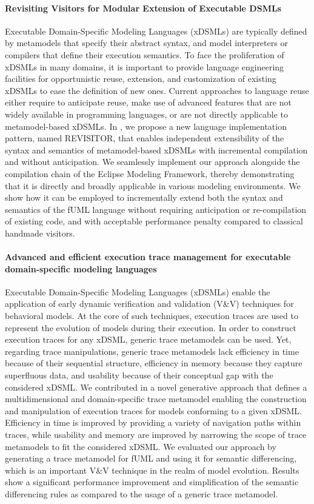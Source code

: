 \paragraph{Revisiting Visitors for Modular Extension of Executable DSMLs}
Executable Domain-Specific Modeling Languages (xDSMLs) are typically defined by metamodels that specify their abstract syntax, and model interpreters or compilers that define their execution semantics. To face the proliferation of xDSMLs in many domains, it is important to provide language engineering facilities for opportunistic reuse, extension, and customization of existing xDSMLs to ease the definition of new ones. Current approaches to language reuse either require to anticipate reuse, make use of advanced features that are not widely available in programming languages, or are not directly applicable to metamodel-based xDSMLs. In \cite{leduc:hal-01568169}, we propose a new language implementation pattern, named REVISITOR, that enables independent extensibility of the syntax and semantics of metamodel-based xDSMLs with incremental compilation and without anticipation. We seamlessly implement our approach alongside the compilation chain of the Eclipse Modeling Framework, thereby demonstrating that it is directly and broadly applicable in various modeling environments. We show how it can be employed to incrementally extend both the syntax and semantics of the fUML language without requiring anticipation or re-compilation of existing code, and with acceptable performance penalty compared to classical handmade visitors.

\paragraph{Advanced and efficient execution trace management for executable domain-specific modeling languages}
Executable Domain-Specific Modeling Languages (xDSMLs) enable the application of early dynamic verification and validation (V\&V) techniques for behavioral models. At the core of such techniques, execution traces are used to represent the evolution of models during their execution. In order to construct execution traces for any xDSML, generic trace metamodels can be used. Yet, regarding trace manipulations, generic trace metamodels lack efficiency in time because of their sequential structure, efficiency in memory because they capture superfluous data, and usability because of their conceptual gap with the considered xDSML. We contributed in \cite{bousse:hal-01614377} a novel generative approach that defines a multidimensional and domain-specific trace metamodel enabling the construction and manipulation of execution traces for models conforming to a given xDSML. Efficiency in time is improved by providing a variety of navigation paths within traces, while usability and memory are improved by narrowing the scope of trace metamodels to fit the considered xDSML. We evaluated our approach by generating a trace metamodel for fUML and using it for semantic differencing, which is an important V\&V technique in the realm of model evolution. Results show a significant performance improvement and simplification of the semantic differencing rules as compared to the usage of a generic trace metamodel.

